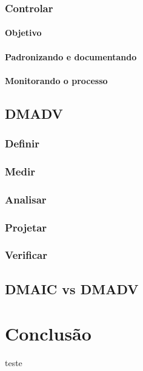 \documentclass{abnt}
\begin{document}
				\subsection {Controlar}
					\subsubsection {Objetivo}
					\subsubsection {Padronizando e documentando}
					\subsubsection {Monitorando o processo}
			\section {DMADV}
				\subsection {Definir}
				\subsection {Medir}
				\subsection {Analisar}
				\subsection {Projetar}
				\subsection {Verificar}
			\section {DMAIC vs DMADV}
	
	\chapter {Conclusão}
	
	\begin{thebibliography}{99}
		 teste
	\end{thebibliography}
\end{document}
